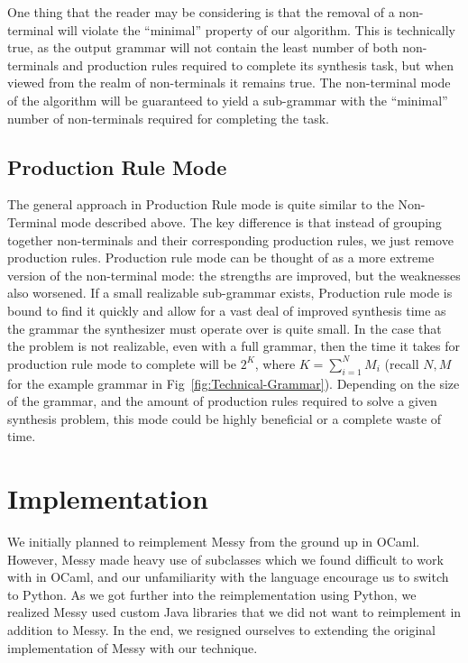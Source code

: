 \documentclass[acmsmall, nonacm]{acmart}
\begin{document}
One thing that the reader may be considering is that the removal of a non-terminal will violate the ``minimal'' property of our algorithm. This is technically true, as the output grammar will not contain the least number of both non-terminals and production rules required to complete its synthesis task, but when viewed from the realm of non-terminals it remains true. The non-terminal mode of the algorithm will be guaranteed to yield a sub-grammar with the ``minimal'' number of non-terminals required for completing the task.

\subsection{Production Rule Mode}
The general approach in Production Rule mode is quite similar to the Non-Terminal mode described above. The key difference is that instead of grouping together non-terminals and their corresponding production rules, we just remove production rules. Production rule mode can be thought of as a more extreme version of the non-terminal mode: the strengths are improved, but the weaknesses also worsened.
If a small realizable sub-grammar exists, Production rule mode is bound to find it quickly and allow for a vast deal of improved synthesis time as the grammar the synthesizer must operate over is quite small. In the case that the problem is not realizable, even with a full grammar, then the time it takes for production rule mode to complete will be $2^K$, where $K = \sum_{i = 1}^{N} M_i$ (recall $N,M$ for the example grammar in Fig~\ref{fig:Technical-Grammar}).
Depending on the size of the grammar, and the amount of production rules required
to solve a given synthesis problem, this mode could be highly beneficial or a complete waste of time.

\section{Implementation}
We initially planned to reimplement Messy from the ground up in OCaml. However, Messy made heavy use of subclasses which we found difficult to work with in OCaml, and our unfamiliarity with the language encourage us to switch to Python. As we got further into the reimplementation using Python, we realized Messy used custom Java libraries that we did not want to reimplement in addition to Messy. In the end, we resigned ourselves to extending the original implementation of Messy with our technique.
\end{document}
